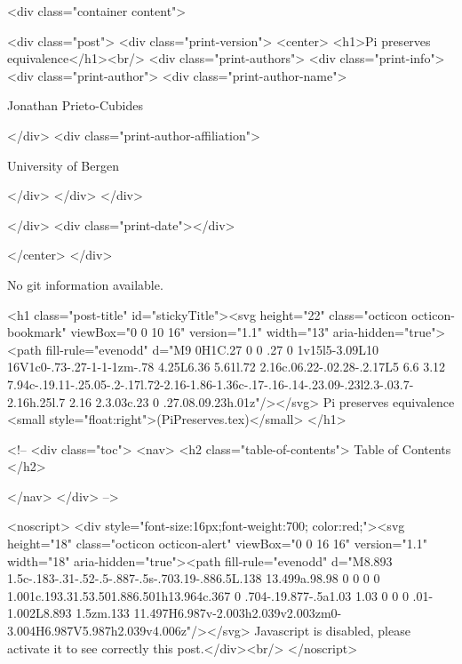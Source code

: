       <div class="container content">
        







<div class="post">
  <div class="print-version">
    <center>
      <h1>Pi preserves equivalence</h1><br/>
        <div class="print-authors">
          <div class="print-info">
            <div class="print-author">
              <div class="print-author-name">
                
                  Jonathan Prieto-Cubides
                
              </div>
              <div class="print-author-affiliation">
                
                  University of Bergen
                
                </div>
            </div>
          </div>
          
          
        </div>
        <div class="print-date"></div>
        
        
    </center>
  </div>

  
  No git information available.
  

  <h1 class="post-title" id="stickyTitle"><svg height="22" class="octicon octicon-bookmark" viewBox="0 0 10 16" version="1.1" width="13" aria-hidden="true"><path fill-rule="evenodd" d="M9 0H1C.27 0 0 .27 0 1v15l5-3.09L10 16V1c0-.73-.27-1-1-1zm-.78 4.25L6.36 5.61l.72 2.16c.06.22-.02.28-.2.17L5 6.6 3.12 7.94c-.19.11-.25.05-.2-.17l.72-2.16-1.86-1.36c-.17-.16-.14-.23.09-.23l2.3-.03.7-2.16h.25l.7 2.16 2.3.03c.23 0 .27.08.09.23h.01z"/></svg> Pi preserves equivalence <small style="float:right">(PiPreserves.tex)</small>
  </h1>

  <!-- 
  <div class="toc">
    <nav>
    <h2 class="table-of-contents"> Table of Contents </h2>
      

    </nav>
  </div>
   -->

  <noscript>
  <div style="font-size:16px;font-weight:700; color:red;"><svg height="18" class="octicon octicon-alert" viewBox="0 0 16 16" version="1.1" width="18" aria-hidden="true"><path fill-rule="evenodd" d="M8.893 1.5c-.183-.31-.52-.5-.887-.5s-.703.19-.886.5L.138 13.499a.98.98 0 0 0 0 1.001c.193.31.53.501.886.501h13.964c.367 0 .704-.19.877-.5a1.03 1.03 0 0 0 .01-1.002L8.893 1.5zm.133 11.497H6.987v-2.003h2.039v2.003zm0-3.004H6.987V5.987h2.039v4.006z"/></svg> Javascript is disabled, please activate it to see correctly this post.</div><br/>
  </noscript>

